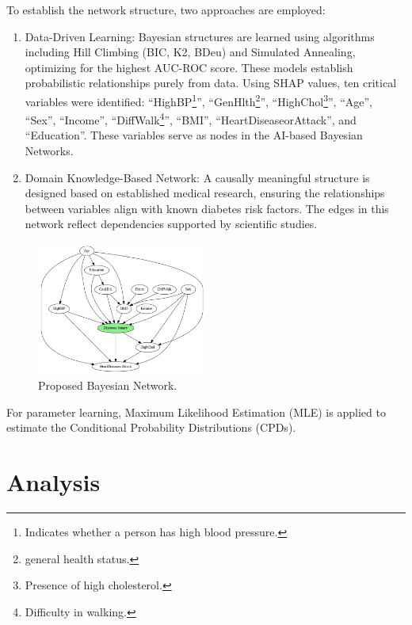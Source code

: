 \documentclass[letterpaper]{article}
\begin{document}
 To establish the network structure, two approaches are employed:
\begin{enumerate}
	\item Data-Driven Learning: Bayesian structures are learned using algorithms including Hill Climbing (BIC, K2, BDeu) and Simulated Annealing, optimizing for the highest AUC-ROC score. These models establish probabilistic relationships purely from data. Using SHAP values, ten critical variables were identified: ``HighBP\footnote{Indicates whether a person has high blood pressure.}'', ``GenHlth\footnote{general health status.}'', ``HighChol\footnote{Presence of high cholesterol.}'', ``Age'', ``Sex'', ``Income'', ``DiffWalk\footnote{Difficulty in walking.}'', ``BMI'', ``HeartDiseaseorAttack'', and ``Education''. These variables serve as nodes in the AI-based Bayesian Networks.
	\item Domain Knowledge-Based Network: A causally meaningful structure is designed based on established medical research, ensuring the relationships between variables align with known diabetes risk factors. The edges in this network reflect dependencies supported by scientific studies.
\end{enumerate}

\begin{figure}[ht]
	\centering
	\includegraphics[width=0.5\textwidth]{images/bn-domain-knowledge.png}
	\caption{Proposed Bayesian Network.} 
	\label{fig:model}
\end{figure}

For parameter learning, Maximum Likelihood Estimation (MLE) is applied to estimate the Conditional Probability Distributions (CPDs).


\section{Analysis}
\end{document}
